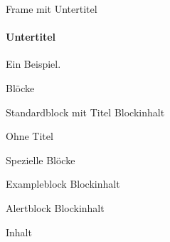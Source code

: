 \documentclass[
	ngerman,%
	aspectratio=169,%
	color={accentcolor=2d},
	logo=false,%
	colorframetitle=true,%
	]{tudabeamer}
\begin{document}
\begin{frame}{Frame mit Untertitel}
\framesubtitle{Untertitel}
Ein Beispiel.
\end{frame}

\begin{frame}{Blöcke}
\begin{block}{Standardblock mit Titel}
	Blockinhalt
\end{block}
\begin{block}{}
	Ohne Titel
\end{block}
\end{frame}

\begin{frame}{Spezielle Blöcke}
\begin{exampleblock}{Exampleblock}
	Blockinhalt
\end{exampleblock}
\begin{alertblock}{Alertblock}
	Blockinhalt
\end{alertblock}
\begin{example}
	Inhalt
\end{example}
\end{frame}
\end{document}
